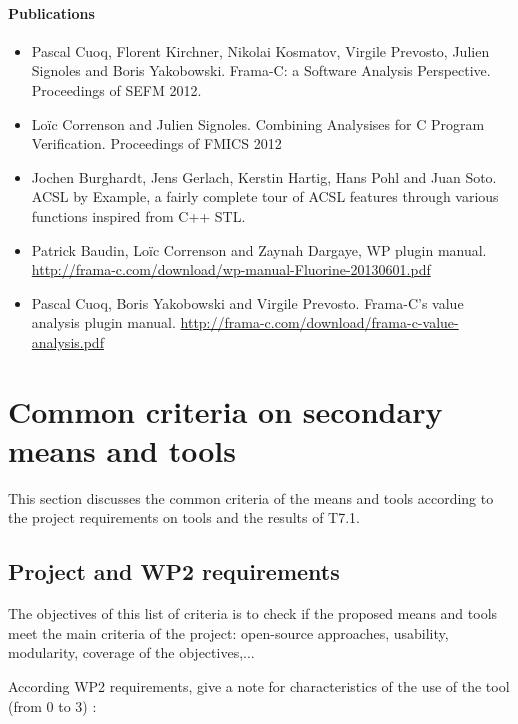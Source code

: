 \paragraph{Publications}
\begin{itemize}
\item Pascal Cuoq, Florent Kirchner, Nikolai Kosmatov, Virgile Prevosto,
  Julien Signoles and Boris Yakobowski. Frama-C: a Software Analysis
  Perspective. Proceedings of SEFM 2012.
\item Loïc Correnson and Julien Signoles. Combining Analysises for
  C Program Verification. Proceedings of FMICS 2012
\item Jochen Burghardt, Jens Gerlach, Kerstin Hartig, Hans Pohl and Juan Soto.
  ACSL by Example, a fairly complete tour of ACSL features through
  various functions inspired from C++ STL.
\item Patrick Baudin, Loïc Correnson and Zaynah Dargaye, WP plugin manual.
\url{http://frama-c.com/download/wp-manual-Fluorine-20130601.pdf}
\item Pascal Cuoq, Boris Yakobowski and Virgile Prevosto.
  Frama-C's value analysis plugin manual. 
  \url{http://frama-c.com/download/frama-c-value-analysis.pdf}
\end{itemize}


\section{Common criteria on secondary means and tools}
\label{sec:frama-c-common}
This section discusses the common criteria of the means and tools according to the project requirements on tools and the results of T7.1.

\subsection{Project and WP2 requirements}

The objectives of this list of criteria is to check if the proposed means and tools meet the main criteria of the project: open-source approaches, usability, modularity, coverage of the objectives,...

According WP2 requirements, give a note for characteristics of the use of the tool (from 0 to 3) :


